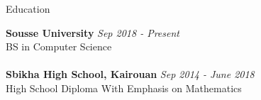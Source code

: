 \documentclass{resume} %
\begin{document}

\begin{rSection}{Education}

{\bf Sousse University} \hfill {\em Sep 2018 - Present} 
\\ BS in Computer Science
\\ 
\\{\bf Sbikha High School, Kairouan} \hfill {\em Sep 2014 - June 2018} 
\\ High School Diploma With Emphasis on Mathematics


\end{rSection}

\end{document}
